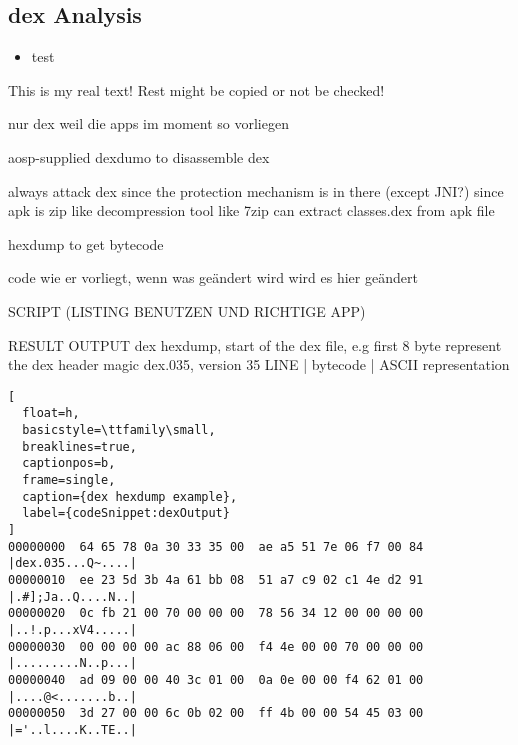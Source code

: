 \subsection{dex Analysis} \label{subsection:tools-dex}
\begin{itemize}
    \item test
\end{itemize}
This is my real text! Rest might be copied or not be checked!


%
nur dex weil die apps im moment so vorliegen

aosp-supplied dexdumo to disassemble dex

\cite{andevconDalvikART}
%
%
always attack dex since the protection mechanism is in there (except JNI?)
since apk is zip like decompression tool like 7zip can extract classes.dex from apk file

hexdump to get bytecode


code wie er vorliegt, wenn was geändert wird wird es hier geändert



SCRIPT (LISTING BENUTZEN UND RICHTIGE APP)

RESULT OUTPUT
dex hexdump, start of the dex file, e.g first 8 byte represent the dex header magic dex.035, version 35\cite{developersDalvik}
LINE | bytecode | ASCII representation
\begin{lstlisting}[
  float=h,
  basicstyle=\ttfamily\small,
  breaklines=true,
  captionpos=b,
  frame=single,
  caption={dex hexdump example},
  label={codeSnippet:dexOutput}
]
00000000  64 65 78 0a 30 33 35 00  ae a5 51 7e 06 f7 00 84  |dex.035...Q~....|
00000010  ee 23 5d 3b 4a 61 bb 08  51 a7 c9 02 c1 4e d2 91  |.#];Ja..Q....N..|
00000020  0c fb 21 00 70 00 00 00  78 56 34 12 00 00 00 00  |..!.p...xV4.....|
00000030  00 00 00 00 ac 88 06 00  f4 4e 00 00 70 00 00 00  |.........N..p...|
00000040  ad 09 00 00 40 3c 01 00  0a 0e 00 00 f4 62 01 00  |....@<.......b..|
00000050  3d 27 00 00 6c 0b 02 00  ff 4b 00 00 54 45 03 00  |='..l....K..TE..|
\end{lstlisting}





